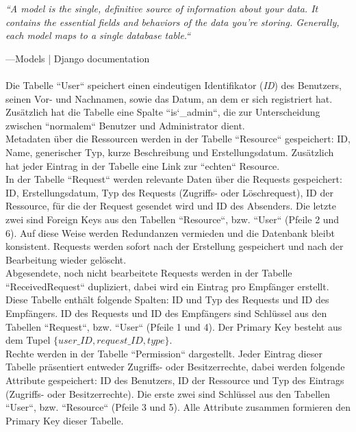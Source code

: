 \documentclass[parskip=full,11pt]{scrartcl}
\begin{document}
    \begin{center}
    \textit{``A model is the single, definitive source of information about your data. It contains the essential fields and behaviors of the data you’re storing. Generally, each model maps to a single database table.``}
    \end{center}
    —Models | Django documentation\\\\
    
Die Tabelle ``User`` speichert einen eindeutigen Identifikator (\textit{ID}) des Benutzers, seinen Vor- und Nachnamen, sowie das Datum, an dem er sich registriert hat. Zusätzlich hat die Tabelle eine Spalte ``is\char`_admin``, die zur Unterscheidung zwischen ``normalem`` Benutzer und Administrator dient.\\
Metadaten über die Ressourcen werden in der Tabelle ``Resource`` gespeichert: ID, Name, generischer Typ, kurze Beschreibung und Erstellungsdatum. Zusätzlich hat jeder Eintrag in der Tabelle eine Link zur ``echten`` Resource.\\
In der Tabelle ``Request`` werden relevante Daten über die Requests gespeichert: ID, Erstellungsdatum, Typ des Requests (Zugriffs- oder Löschrequest), ID der Ressource, für die der Request gesendet wird und ID des Absenders. Die letzte zwei sind Foreign Keys aus den Tabellen ``Resource``, bzw. ``User`` (Pfeile 2 und 6). Auf diese Weise werden Redundanzen vermieden und die Datenbank bleibt konsistent. Requests werden sofort nach der Erstellung gespeichert und nach der Bearbeitung wieder gelöscht.\\
Abgesendete, noch nicht bearbeitete Requests werden in der Tabelle ``ReceivedRequest`` dupliziert, dabei wird ein Eintrag pro Empfänger erstellt. Diese Tabelle enthält folgende Spalten: ID und Typ des Requests und ID des Empfängers. ID des Requests und ID des Empfängers sind Schlüssel aus den Tabellen ``Request``, bzw. ``User`` (Pfeile 1 und 4).  Der Primary Key besteht aus dem Tupel $\{user{\_}ID, request{\_}ID, type\}$.\\
Rechte werden in der Tabelle ``Permission`` dargestellt. Jeder Eintrag dieser Tabelle präsentiert entweder Zugriffs- oder Besitzerrechte, dabei werden folgende Attribute gespeichert: ID des Benutzers, ID der Ressource und Typ des Eintrags (Zugriffs- oder Besitzerrechte). Die erste zwei sind Schlüssel aus den Tabellen ``User``, bzw. ``Resource`` (Pfeile 3 und 5). Alle Attribute zusammen formieren den Primary Key dieser Tabelle. \\
 
\end{document}

